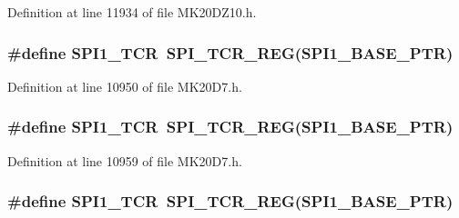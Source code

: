 Definition at line 11934 of file M\+K20\+D\+Z10.\+h.

\subsubsection[{\texorpdfstring{S\+P\+I1\+\_\+\+T\+CR}{SPI1_TCR}}]{\setlength{\rightskip}{0pt plus 5cm}\#define S\+P\+I1\+\_\+\+T\+CR~{\bf S\+P\+I\+\_\+\+T\+C\+R\+\_\+\+R\+EG}({\bf S\+P\+I1\+\_\+\+B\+A\+S\+E\+\_\+\+P\+TR})}\hypertarget{group___s_p_i___register___accessor___macros_ga5ade51be82bf9bed7a9ed2b7a603df4a}{}\label{group___s_p_i___register___accessor___macros_ga5ade51be82bf9bed7a9ed2b7a603df4a}


Definition at line 10950 of file M\+K20\+D7.\+h.

\subsubsection[{\texorpdfstring{S\+P\+I1\+\_\+\+T\+CR}{SPI1_TCR}}]{\setlength{\rightskip}{0pt plus 5cm}\#define S\+P\+I1\+\_\+\+T\+CR~{\bf S\+P\+I\+\_\+\+T\+C\+R\+\_\+\+R\+EG}({\bf S\+P\+I1\+\_\+\+B\+A\+S\+E\+\_\+\+P\+TR})}\hypertarget{group___s_p_i___register___accessor___macros_ga5ade51be82bf9bed7a9ed2b7a603df4a}{}\label{group___s_p_i___register___accessor___macros_ga5ade51be82bf9bed7a9ed2b7a603df4a}


Definition at line 10959 of file M\+K20\+D7.\+h.

\subsubsection[{\texorpdfstring{S\+P\+I1\+\_\+\+T\+CR}{SPI1_TCR}}]{\setlength{\rightskip}{0pt plus 5cm}\#define S\+P\+I1\+\_\+\+T\+CR~{\bf S\+P\+I\+\_\+\+T\+C\+R\+\_\+\+R\+EG}({\bf S\+P\+I1\+\_\+\+B\+A\+S\+E\+\_\+\+P\+TR})}\hypertarget{group___s_p_i___register___accessor___macros_ga5ade51be82bf9bed7a9ed2b7a603df4a}{}\label{group___s_p_i___register___accessor___macros_ga5ade51be82bf9bed7a9ed2b7a603df4a}


